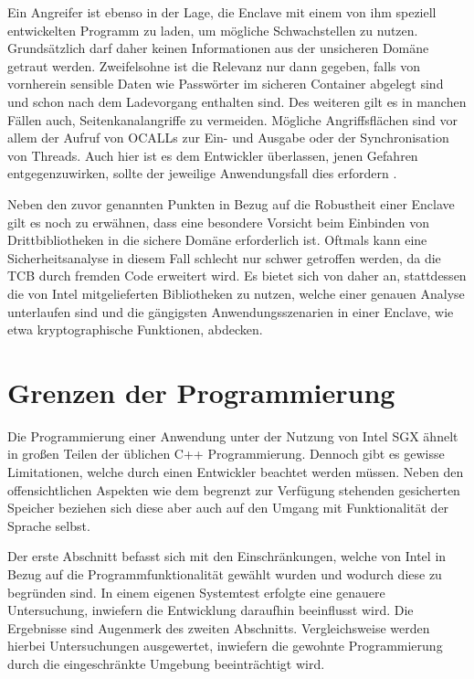 Ein Angreifer ist ebenso in der Lage, die Enclave mit einem von ihm speziell entwickelten Programm zu laden, um mögliche Schwachstellen zu nutzen. Grundsätzlich darf daher keinen Informationen aus der unsicheren Domäne getraut werden. Zweifelsohne ist die Relevanz nur dann gegeben, falls von vornherein sensible Daten wie Passwörter im sicheren Container abgelegt sind und schon nach dem Ladevorgang enthalten sind. Des weiteren gilt es in manchen Fällen auch, Seitenkanalangriffe zu vermeiden. Mögliche Angriffsflächen sind vor allem der Aufruf von OCALLs zur Ein- und Ausgabe oder der Synchronisation von Threads. Auch hier ist es dem Entwickler überlassen, jenen Gefahren entgegenzuwirken, sollte der jeweilige Anwendungsfall dies erfordern \cite{M.2016}.

Neben den zuvor genannten Punkten in Bezug auf die Robustheit einer Enclave gilt es noch zu erwähnen, dass eine besondere Vorsicht beim Einbinden von Drittbibliotheken in die sichere Domäne erforderlich ist. Oftmals kann eine Sicherheitsanalyse in diesem Fall schlecht nur schwer getroffen werden, da die TCB durch fremden Code erweitert wird. Es bietet sich von daher an, stattdessen die von Intel mitgelieferten Bibliotheken zu nutzen, welche einer genauen Analyse unterlaufen sind und die gängigsten Anwendungsszenarien in einer Enclave, wie etwa kryptographische Funktionen, abdecken. 
\section{Grenzen der Programmierung}

Die Programmierung einer Anwendung unter der Nutzung von Intel SGX ähnelt in großen Teilen der üblichen C++ Programmierung. Dennoch gibt es gewisse Limitationen, welche durch einen Entwickler beachtet werden müssen. Neben den offensichtlichen Aspekten wie dem begrenzt zur Verfügung stehenden gesicherten Speicher beziehen sich diese aber auch auf den Umgang mit Funktionalität der Sprache selbst. 

Der erste Abschnitt befasst sich mit den Einschränkungen, welche von Intel in Bezug auf die Programmfunktionalität gewählt wurden und wodurch diese zu begründen sind. In einem eigenen Systemtest erfolgte eine genauere Untersuchung, inwiefern die Entwicklung daraufhin beeinflusst wird. Die Ergebnisse sind Augenmerk des zweiten Abschnitts. Vergleichsweise werden hierbei Untersuchungen ausgewertet, inwiefern die gewohnte Programmierung durch die eingeschränkte Umgebung beeinträchtigt wird.

